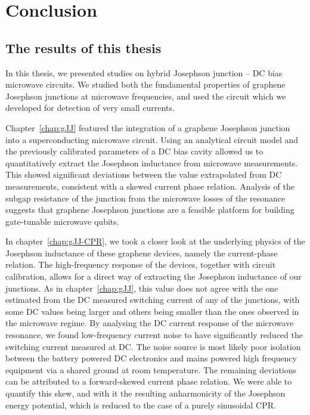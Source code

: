 \newchapstyle
\chapter{Conclusion}
\label{chap:conclusion}

\afterpage{\pagecolor{none}}\newpage

\section{The results of this thesis}
In this thesis, we presented studies on hybrid Josephson junction -- DC bias microwave circuits.
%
We studied both the fundamental properties of graphene Josephson junctions at microwave frequencies, and used the circuit which we developed for detection of very small currents.

Chapter~\ref{chap:gJJ} featured the integration of a graphene Josephson junction into a superconducting microwave circuit.
%
Using an analytical circuit model and the previously calibrated parameters of a DC bias cavity allowed us to quantitatively extract the Josephson inductance from microwave measurements.
%
This showed significant deviations between the value extrapolated from DC measurements, consistent with a skewed current phase relation.
%
Analysis of the subgap resistance of the junction from the microwave losses of the resonance suggests that graphene Josephson junctions are a feasible platform for building gate-tunable microwave qubits.

In chapter~\ref{chap:gJJ-CPR}, we took a closer look at the underlying physics of the Josephson inductance of these graphene devices, namely the current-phase relation.
%
The high-frequency response of the devices, together with circuit calibration, allows for a direct way of extracting the Josephson inductance of our junctions.
%
As in chapter~\ref{chap:gJJ}, this value does not agree with the one estimated from the DC measured switching current of any of the junctions, with some DC values being larger and others being smaller than the ones observed in the microwave regime.
%
By analysing the DC current response of the microwave resonance, we found low-frequency current noise to have significantly reduced the switching current measured at DC.
%
The noise source is most likely poor isolation between the battery powered DC electronics and mains powered high frequency equipment via a shared ground at room temperature.
%
The remaining deviations can be attributed to a forward-skewed current phase relation.
%
We were able to quantify this skew, and with it the resulting anharmonicity of the Josephson energy potential, which is reduced to the case of a purely sinusoidal CPR.

